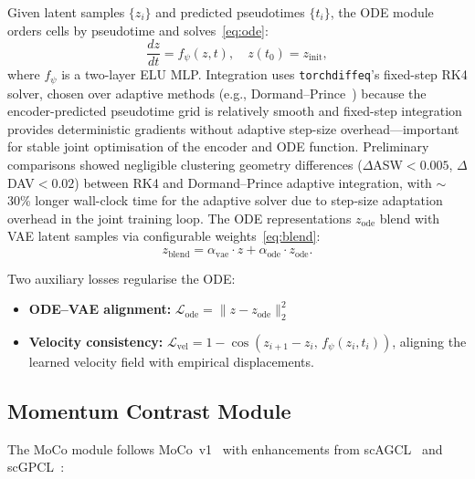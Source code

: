 \documentclass[journal]{IEEEtran}
\begin{document}
Given latent samples $\{z_i\}$ and predicted pseudotimes $\{t_i\}$, the ODE module orders cells by pseudotime and solves~\eqref{eq:ode}:
\begin{equation}
    \frac{dz}{dt} = f_\psi(z, t), \quad z(t_0) = z_{\mathrm{init}},
    \label{eq:ode}
\end{equation}
where $f_\psi$ is a two-layer ELU MLP. Integration uses \texttt{torchdiffeq}'s fixed-step RK4 solver, chosen over adaptive methods (e.g., Dormand--Prince~\cite{dormand1980rk}) because the encoder-predicted pseudotime grid is relatively smooth and fixed-step integration provides deterministic gradients without adaptive step-size overhead---important for stable joint optimisation of the encoder and ODE function. Preliminary comparisons showed negligible clustering geometry differences ($\Delta$ASW$<0.005$, $\Delta$DAV$<0.02$) between RK4 and Dormand--Prince adaptive integration, with $\sim$30\% longer wall-clock time for the adaptive solver due to step-size adaptation overhead in the joint training loop. The ODE representations $z_{\mathrm{ode}}$ blend with VAE latent samples via configurable weights~\eqref{eq:blend}:
\begin{equation}
    z_{\mathrm{blend}} = \alpha_{\mathrm{vae}} \cdot z + \alpha_{\mathrm{ode}} \cdot z_{\mathrm{ode}}.
    \label{eq:blend}
\end{equation}

Two auxiliary losses regularise the ODE:
\begin{itemize}
    \item \textbf{ODE--VAE alignment:} $\mathcal{L}_{\mathrm{ode}} = \| z - z_{\mathrm{ode}} \|_2^2$
    \item \textbf{Velocity consistency:} $\mathcal{L}_{\mathrm{vel}} = 1 - \cos(z_{i+1} - z_i,\, f_\psi(z_i, t_i))$, aligning the learned velocity field with empirical displacements.
\end{itemize}

\subsection{Momentum Contrast Module}
\label{sec:method:moco}

The MoCo module follows MoCo~v1~\cite{he2020momentum} with enhancements from scAGCL~\cite{cai2024scagcl} and scGPCL~\cite{cai2024scgpcl}:
\end{document}
